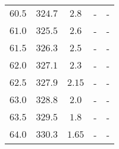 \begin{table}
\begin{tabular}{c c c c c}
        $\num{60.5}$&$\num{324.7}$&$\num{2.8}$&-&-\\
        $\num{61.0}$&$\num{325.5}$&$\num{2.6}$&-&-\\
        $\num{61.5}$&$\num{326.3}$&$\num{2.5}$&-&-\\
        $\num{62.0}$&$\num{327.1}$&$\num{2.3}$&-&-\\
        $\num{62.5}$&$\num{327.9}$&$\num{2.15}$&-&-\\
        $\num{63.0}$&$\num{328.8}$&$\num{2.0}$&-&-\\
        $\num{63.5}$&$\num{329.5}$&$\num{1.8}$&-&-\\
        $\num{64.0}$&$\num{330.3}$&$\num{1.65}$&-&-\\
        \bottomrule
    \end{tabular}
\end{table}




